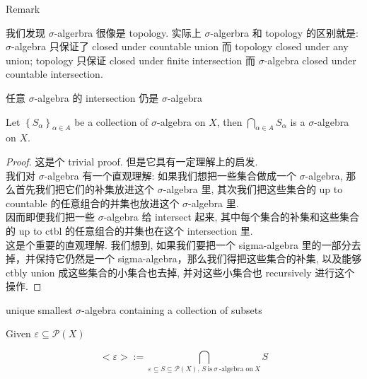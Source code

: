 \documentclass{qlnotes-export}
\begin{document}
\begin{qlremark}{Remark}

我们发现 \(\sigma\)-algerbra 很像是 topology. 实际上 \(\sigma\)-algerbra 和 topology 的区别就是: \(\sigma\)-algebra 只保证了 closed under countable union 而 topology closed under any union; topology 只保证 closed under finite intersection 而 \(\sigma\)-algebra closed under countable intersection.

\end{qlremark}

\begin{lemma}{任意 \(\sigma\)-algebra 的 intersection 仍是 \(\sigma\)-algebra}\label{lem-01-sigma-algebra-measure-sigma-algebra-intersection-sigma-algebra}

Let \(\left\{ S_{\alpha} \right\}_{\alpha \in A}\) be a collection of \(\sigma\)-algebra on \(X\), then \(\bigcap_{\alpha \in A}S_{\alpha}\) is a \(\sigma\)-algebra on \(X\).

\end{lemma}

\begin{proof}

这是个 trivial proof. 但是它具有一定理解上的启发.\\
我们对 \(\sigma\)-algebra 有一个直观理解: 如果我们想把一些集合做成一个 \(\sigma\)-algebra, 那么首先我们把它们的补集放进这个 \(\sigma\)-algebra 里, 其次我们把这些集合的 up to countable 的任意组合的并集也放进这个 \(\sigma\)-algebra 里.\\
因而即便我们把一些 \(\sigma\)-algebra 给 intersect 起来, 其中每个集合的补集和这些集合的 up to ctbl 的任意组合的并集也在这个 intersection 里.\\
这是个重要的直观理解. 我们想到, 如果我们要把一个 sigma-algebra 里的一部分去掉，并保持它仍然是一个 sigma-algebra，那么我们得把这些集合的补集, 以及能够 ctbly union 成这些集合的小集合也去掉, 并对这些小集合也 recursively 进行这个操作.

\end{proof}

\begin{corollary}{unique smallest \(\sigma\)-algebra containing a collection of subsets}\label{cor-01-sigma-algebra-measure-unique-smallest-sigma-algebra-containing-a-collection-of-subsets}

Given \(\varepsilon \subseteq \mathcal{P}(X)\)

\[< \varepsilon > := \bigcap\limits_{\varepsilon \subseteq S \subseteq \mathcal{P}(X),\, S\ \text{is}\ \sigma\ \text{-algebra on}\ X}S\]

\end{corollary}
\end{document}
